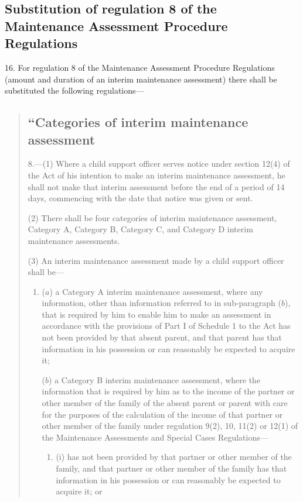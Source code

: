 \documentclass[12pt,a4paper]{article}
\begin{document}
\subsection[16. Substitution of regulation 8 of the Maintenance Assessment Procedure Regulations]{\sloppy Substitution of regulation 8 of the Maintenance Assessment Procedure Regulations}

16.  For regulation 8 of the Maintenance Assessment Procedure Regulations (amount and duration of an interim maintenance assessment) there shall be substituted the following regulations—
\begin{quotation}
\subsection*{“Categories of interim maintenance assessment}

8.—(1) Where a child support officer serves notice under section 12(4) of the Act of his intention to make an interim maintenance assessment, he shall not make that interim assessment before the end of a period of 14 days, commencing with the date that notice was given or sent.

(2) There shall be four categories of interim maintenance assessment, Category A, Category B, Category C, and Category D interim maintenance assessments.

(3) An interim maintenance assessment made by a child support officer shall be—
\begin{enumerate}\item[]
($a$) a Category A interim maintenance assessment, where any information, other than information referred to in sub-paragraph ($b$), that is required by him to enable him to make an assessment in accordance with the provisions of Part I of Schedule 1 to the Act has not been provided by that absent parent, and that parent has that information in his possession or can reasonably be expected to acquire it;

($b$) a Category B interim maintenance assessment, where the information that is required by him as to the income of the partner or other member of the family of the absent parent or parent with care for the purposes of the calculation of the income of that partner or other member of the family under regulation 9(2), 10, 11(2) or 12(1) of the Maintenance Assessments and Special Cases Regulations—
\begin{enumerate}\item[]
(i) has not been provided by that partner or other member of the family, and that partner or other member of the family has that information in his possession or can reasonably be expected to acquire it; or


\end{enumerate}
\end{enumerate}
\end{quotation}
\end{document}
